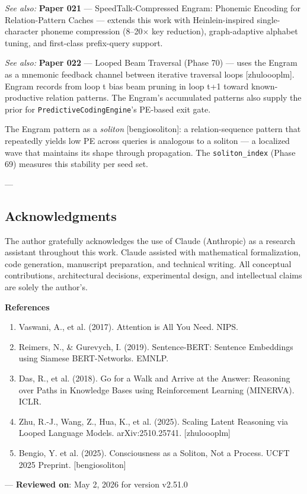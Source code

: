 \textit{See also:} \textbf{Paper 021} — SpeedTalk-Compressed Engram: Phonemic Encoding for Relation-Pattern Caches — extends this work with Heinlein-inspired single-character phoneme compression (8–20$\times$ key reduction), graph-adaptive alphabet tuning, and first-class prefix-query support.

\textit{See also:} \textbf{Paper 022} — Looped Beam Traversal (Phase 70) — uses the Engram as a mnemonic feedback channel between iterative traversal loops [zhu\-loooplm]. Engram records from loop t bias beam pruning in loop t+1 toward known-productive relation patterns. The Engram's accumulated patterns also supply the prior for \texttt{PredictiveCodingEngine}'s PE-based exit gate.

The Engram pattern as a \textit{soliton} [bengio\-soliton]: a relation-sequence pattern that repeatedly yields low PE across queries is analogous to a soliton — a localized wave that maintains its shape through propagation. The \texttt{soliton\_index} (Phase 69) measures this stability per seed set.

---
\subsection{Acknow\-ledgments}

The author gratefully ackno\-wledges the use of Claude (Anthropic) as a research assistant throughout this work. Claude assisted with mathe\-matical forma\-lization, code generation, manuscript preparation, and technical writing. All conceptual contr\-ibutions, archi\-tectural decisions, exper\-imental design, and intel\-lectual claims are solely the author's.

\textbf{References}
\begin{enumerate}
\item Vaswani, A., et al. (2017). Attention is All You Need. NIPS.
\item Reimers, N., \& Gurevych, I. (2019). Sentence-BERT: Sentence Embeddings using Siamese BERT-Networks. EMNLP.
\item Das, R., et al. (2018). Go for a Walk and Arrive at the Answer: Reasoning over Paths in Knowledge Bases using Reinfo\-rcement Learning (MINERVA). ICLR.
\item Zhu, R.-J., Wang, Z., Hua, K., et al. (2025). Scaling Latent Reasoning via Looped Language Models. arXiv:2510.25741. [zhu\-loooplm]
\item Bengio, Y. et al. (2025). Consci\-ousness as a Soliton, Not a Process. UCFT 2025 Preprint. [bengio\-soliton]

\end{enumerate}
---
\textbf{Reviewed on}: May 2, 2026 for version v2.51.0
